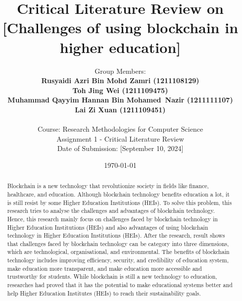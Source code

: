 \documentclass[12pt,a4paper]{article}
\title{Critical Literature Review on [Challenges of using blockchain in higher education]}
\author{Group Members: \\
\textbf{Rusyaidi Azri Bin Mohd Zamri (1211108129)} \\
\textbf{Toh Jing Wei (1211109475)} \\
\textbf{Muhammad Qayyim Hannan Bin Mohamed Nazir (1211111107)} \\
\textbf{Lai Zi Xuan (1211109451)} \\
\\
Course: Research Methodologies for Computer Science \\
Assignment 1 - Critical Literature Review \\
Date of Submission: [September 10, 2024]}
\date{\today}
\begin{document}
\maketitle
\newpage

\begin{abstract}
    \noindent
    Blockchain is a new technology that revolutionize society in fields like finance, healthcare, and education. Although blockchain technology benefits education a lot, it is still resist by some Higher Education Institutions (HEIs). To solve this problem, this research tries to analyse the challenges and advantages of blockchain technology. Hence, this research mainly focus on challenges faced by blockchain technology in Higher Education Institutions (HEIs) and also advantages of using blockchain technology in Higher Education Institutions (HEIs). After the research, result shows that challenges faced by blockchain technology can be category into three dimensions, which are technological, organisational, and environmental. The benefits of blockchain technology includes improving efficiency, security, and credibility of education system, make education more transparent, and make education more accessible and trustworthy for students. While blockchain is still a new technology to education, researches had proved that it has the potential to make educational systems better and help Higher Education Institutes (HEIs) to reach their sustainability goals.
\end{abstract}
\newpage

\tableofcontents
\newpage

\end{document}
